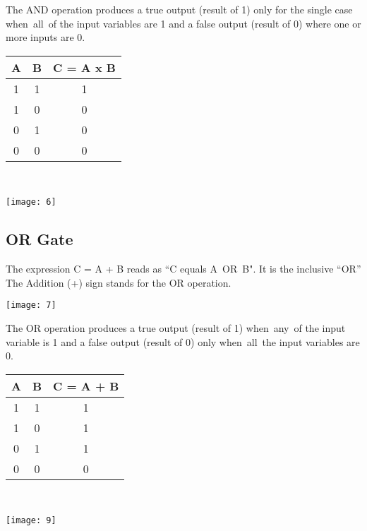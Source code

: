 \documentclass{article}
\begin{document}
The AND operation produces a true output (result of 1) only for the single case when all of the input variables are 1 and a false output (result of 0) where one or more inputs are 0. \\
\begin{table}[h!]
	\begin{center}
		\begin{tabular}{c|c|c}
			\textbf{A} & \textbf{B} &
			\textbf{C = A x B}\\
			\hline
			1 & 1 & 1\\
			\hline
			1 & 0 & 0\\
			\hline
			0 & 1 & 0\\
			\hline
			0 & 0 & 0\\
			\hline
		\end{tabular}
	\end{center}
\end{table} \\
\begin{center}
	\texttt{[image: 6]}
\end{center} 

\subsection{OR Gate}
The expression C = A + B reads as “C equals A OR B". It is the inclusive “OR”
The Addition (+) sign stands for the OR operation. \\
\begin{center}\texttt{[image: 7]}\end{center}

The OR operation produces a true output (result of 1) when any of the input variable is 1 and a false output (result of 0) only when all the input variables are 0. \\
\begin{table}[h!]
	\begin{center}
		\begin{tabular}{c|c|c}
			\textbf{A} & \textbf{B} &
			\textbf{C = A + B}\\
			\hline
			1 & 1 & 1\\
			\hline
			1 & 0 & 1\\
			\hline
			0 & 1 & 1\\
			\hline
			0 & 0 & 0\\
			\hline
		\end{tabular}
	\end{center}
\end{table} \\ 
\begin{center}
	\texttt{[image: 9]} 
\end{center}
\end{document}
